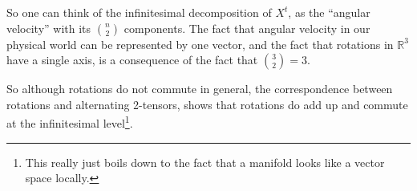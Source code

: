 \documentclass[12pt]{article}
\newcommand{\real}{\mathbb{R}}
\begin{document}
So one can think of the infinitesimal decomposition of $X^t$, as the ``angular velocity'' with  its $\binom{n}{2}$ components.  The fact that angular velocity in our physical world
can be represented by one vector, and the fact that rotations in $\real^3$ have a single axis,
is a consequence of the fact that $\binom{3}{2} = 3$. 

So although rotations do not commute in general, the correspondence between rotations
and alternating 2-tensors, shows that rotations do add up
and commute at the infinitesimal level\footnote{This really just boils down to the fact that a manifold looks like a vector space locally.}.
\end{document}
